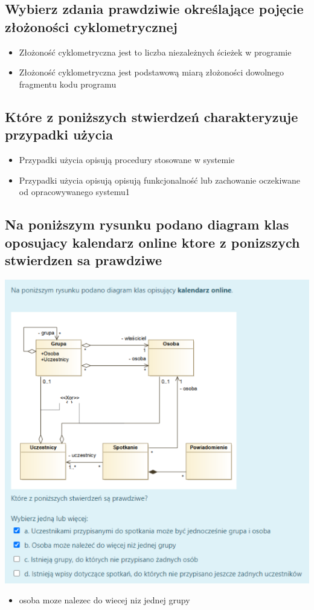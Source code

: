 \documentclass[11pt]{article}
\begin{document}
\subsection{Wybierz zdania prawdziwie określające pojęcie złożoności cyklometrycznej}
\label{sec:org30792a3}
\begin{itemize}
\item Złożoność cyklometryczna jest to liczba niezależnych ścieżek w programie
\item Złożoność cyklometryczna jest podstawową miarą złożoności dowolnego fragmentu kodu programu
\end{itemize}
\subsection{Które z poniższych stwierdzeń charakteryzuje przypadki użycia}
\label{sec:org509dba3}
\begin{itemize}
\item Przypadki użycia opisują procedury stosowane w systemie
\item Przypadki użycia opisują opisują funkcjonalność lub zachowanie oczekiwane od opracowywanego systemu1
\end{itemize}
\subsection{Na poniższym rysunku podano diagram klas oposujacy kalendarz online ktore z ponizszych stwierdzen sa prawdziwe}
\label{sec:org8937954}
\begin{center}
\includegraphics[width=.9\linewidth]{./zadanie1.png}
\end{center}
\begin{itemize}
\item osoba moze nalezec do wiecej niz jednej grupy
\end{itemize}
\end{document}

